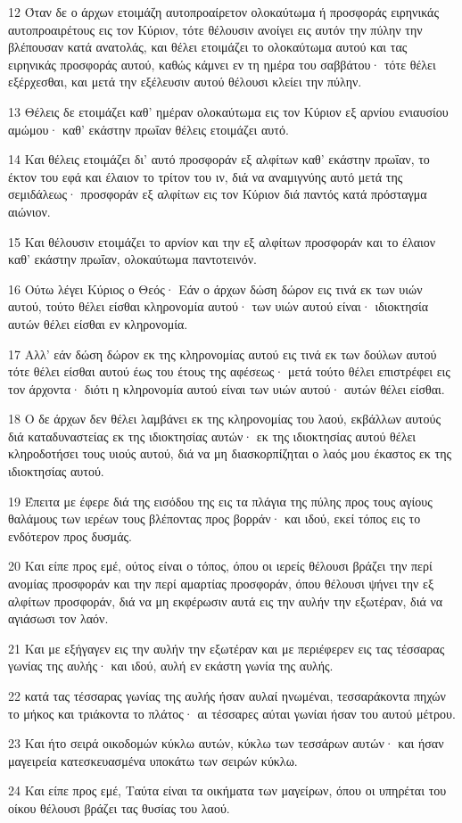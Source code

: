 \par 12 Όταν δε ο άρχων ετοιμάζη αυτοπροαίρετον ολοκαύτωμα ή προσφοράς ειρηνικάς αυτοπροαιρέτους εις τον Κύριον, τότε θέλουσιν ανοίγει εις αυτόν την πύλην την βλέπουσαν κατά ανατολάς, και θέλει ετοιμάζει το ολοκαύτωμα αυτού και τας ειρηνικάς προσφοράς αυτού, καθώς κάμνει εν τη ημέρα του σαββάτου· τότε θέλει εξέρχεσθαι, και μετά την εξέλευσιν αυτού θέλουσι κλείει την πύλην.
\par 13 Θέλεις δε ετοιμάζει καθ' ημέραν ολοκαύτωμα εις τον Κύριον εξ αρνίου ενιαυσίου αμώμου· καθ' εκάστην πρωΐαν θέλεις ετοιμάζει αυτό.
\par 14 Και θέλεις ετοιμάζει δι' αυτό προσφοράν εξ αλφίτων καθ' εκάστην πρωΐαν, το έκτον του εφά και έλαιον το τρίτον του ιν, διά να αναμιγνύης αυτό μετά της σεμιδάλεως· προσφοράν εξ αλφίτων εις τον Κύριον διά παντός κατά πρόσταγμα αιώνιον.
\par 15 Και θέλουσιν ετοιμάζει το αρνίον και την εξ αλφίτων προσφοράν και το έλαιον καθ' εκάστην πρωΐαν, ολοκαύτωμα παντοτεινόν.
\par 16 Ούτω λέγει Κύριος ο Θεός· Εάν ο άρχων δώση δώρον εις τινά εκ των υιών αυτού, τούτο θέλει είσθαι κληρονομία αυτού· των υιών αυτού είναι· ιδιοκτησία αυτών θέλει είσθαι εν κληρονομία.
\par 17 Αλλ' εάν δώση δώρον εκ της κληρονομίας αυτού εις τινά εκ των δούλων αυτού τότε θέλει είσθαι αυτού έως του έτους της αφέσεως· μετά τούτο θέλει επιστρέφει εις τον άρχοντα· διότι η κληρονομία αυτού είναι των υιών αυτού· αυτών θέλει είσθαι.
\par 18 Ο δε άρχων δεν θέλει λαμβάνει εκ της κληρονομίας του λαού, εκβάλλων αυτούς διά καταδυναστείας εκ της ιδιοκτησίας αυτών· εκ της ιδιοκτησίας αυτού θέλει κληροδοτήσει τους υιούς αυτού, διά να μη διασκορπίζηται ο λαός μου έκαστος εκ της ιδιοκτησίας αυτού.
\par 19 Έπειτα με έφερε διά της εισόδου της εις τα πλάγια της πύλης προς τους αγίους θαλάμους των ιερέων τους βλέποντας προς βορράν· και ιδού, εκεί τόπος εις το ενδότερον προς δυσμάς.
\par 20 Και είπε προς εμέ, ούτος είναι ο τόπος, όπου οι ιερείς θέλουσι βράζει την περί ανομίας προσφοράν και την περί αμαρτίας προσφοράν, όπου θέλουσι ψήνει την εξ αλφίτων προσφοράν, διά να μη εκφέρωσιν αυτά εις την αυλήν την εξωτέραν, διά να αγιάσωσι τον λαόν.
\par 21 Και με εξήγαγεν εις την αυλήν την εξωτέραν και με περιέφερεν εις τας τέσσαρας γωνίας της αυλής· και ιδού, αυλή εν εκάστη γωνία της αυλής.
\par 22 κατά τας τέσσαρας γωνίας της αυλής ήσαν αυλαί ηνωμέναι, τεσσαράκοντα πηχών το μήκος και τριάκοντα το πλάτος· αι τέσσαρες αύται γωνίαι ήσαν του αυτού μέτρου.
\par 23 Και ήτο σειρά οικοδομών κύκλω αυτών, κύκλω των τεσσάρων αυτών· και ήσαν μαγειρεία κατεσκευασμένα υποκάτω των σειρών κύκλω.
\par 24 Και είπε προς εμέ, Ταύτα είναι τα οικήματα των μαγείρων, όπου οι υπηρέται του οίκου θέλουσι βράζει τας θυσίας του λαού.

